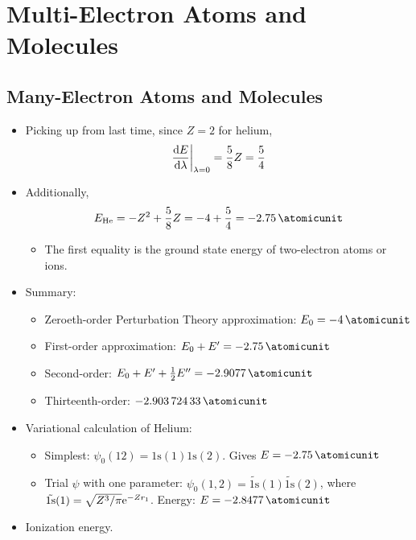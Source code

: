 \documentclass[../notes.tex]{subfiles}
\begin{document}
\chapter{Multi-Electron Atoms and Molecules}
\section{Many-Electron Atoms and Molecules}
\begin{itemize}
    \item {}Picking up from last time, since $Z=2$ for helium,
    \begin{equation*}
        \dv{E}{\lambda}\bigg|_{\lambda=0} = \frac{5}{8}Z = \frac{5}{4}
    \end{equation*}
    \item Additionally,
    \begin{equation*}
        E_{\ce{He}} = -Z^2+\frac{5}{8}Z = -4+\frac{5}{4} = \SI{-2.75}{\atomicunit}
    \end{equation*}
    \begin{itemize}
        \item The first equality is the ground state energy of two-electron atoms or ions.
    \end{itemize}
    \item Summary:
    \begin{itemize}
        \item Zeroeth-order Perturbation Theory approximation: $E_0=\SI{-4}{\atomicunit}$
        \item First-order approximation: $E_0+E'=\SI{-2.75}{\atomicunit}$
        \item Second-order: $E_0+E'+\frac{1}{2}E''=\SI{-2.9077}{\atomicunit}$
        \item Thirteenth-order: $\SI{-2.90372433}{\atomicunit}$
    \end{itemize}
    \item Variational calculation of Helium:
    \begin{itemize}
        \item Simplest: $\psi_0(12)=\text{1s}(1)\text{1s}(2)$. Gives $E=\SI{-2.75}{\atomicunit}$
        \item Trial $\psi$ with one parameter: $\psi_0(1,2)=\tilde{\text{1s}}(1)\tilde{\text{1s}}(2)$, where $\tilde{\text{1s}}(1)=\sqrt{Z^3/\pi}\e[-Zr_1]$. Energy: $E=\SI{-2.8477}{\atomicunit}$
    \end{itemize}
    \item Ionization energy.
    \begin{itemize}

\end{itemize}
\end{itemize}
\end{document}

